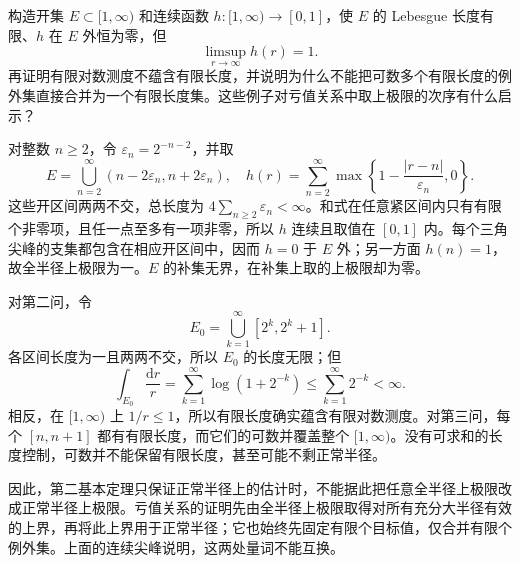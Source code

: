 \begin{exercise}\label{b3:ex:C-5}
构造开集 \(E\subset[1,\infty)\) 和连续函数 \(h:[1,\infty)\to[0,1]\)，使 \(E\) 的 Lebesgue 长度有限、\(h\) 在 \(E\) 外恒为零，但
\[
 \limsup_{r\to\infty}h(r)=1.
\]
再证明有限对数测度不蕴含有限长度，并说明为什么不能把可数多个有限长度的例外集直接合并为一个有限长度集。这些例子对亏值关系中取上极限的次序有什么启示？
\end{exercise}
\begin{solution}
对整数 \(n\ge2\)，令 \(\varepsilon_n=2^{-n-2}\)，并取
\[
 E=\bigcup_{n=2}^\infty
      (n-2\varepsilon_n,n+2\varepsilon_n),
 \quad h(r)=\sum_{n=2}^\infty
      \max\left\{1-\frac{|r-n|}{\varepsilon_n},0\right\}.
\]
这些开区间两两不交，总长度为 \(4\sum_{n\ge2}\varepsilon_n<\infty\)。和式在任意紧区间内只有有限个非零项，且任一点至多有一项非零，所以 \(h\) 连续且取值在 \([0,1]\) 内。每个三角尖峰的支集都包含在相应开区间中，因而 \(h=0\) 于 \(E\) 外；另一方面 \(h(n)=1\)，故全半径上极限为一。\(E\) 的补集无界，在补集上取的上极限却为零。

对第二问，令
\[
 E_0=\bigcup_{k=1}^\infty[2^k,2^k+1].
\]
各区间长度为一且两两不交，所以 \(E_0\) 的长度无限；但
\[
 \int_{E_0}\frac{\mathrm{d}r}{r}
 =\sum_{k=1}^\infty\log(1+2^{-k})
 \le\sum_{k=1}^\infty2^{-k}<\infty.
\]
相反，在 \([1,\infty)\) 上 \(1/r\le1\)，所以有限长度确实蕴含有限对数测度。对第三问，每个 \([n,n+1]\) 都有有限长度，而它们的可数并覆盖整个 \([1,\infty)\)。没有可求和的长度控制，可数并不能保留有限长度，甚至可能不剩正常半径。

因此，第二基本定理只保证正常半径上的估计时，不能据此把任意全半径上极限改成正常半径上极限。亏值关系的证明先由全半径上极限取得对所有充分大半径有效的上界，再将此上界用于正常半径；它也始终先固定有限个目标值，仅合并有限个例外集。上面的连续尖峰说明，这两处量词不能互换。
\end{solution}

